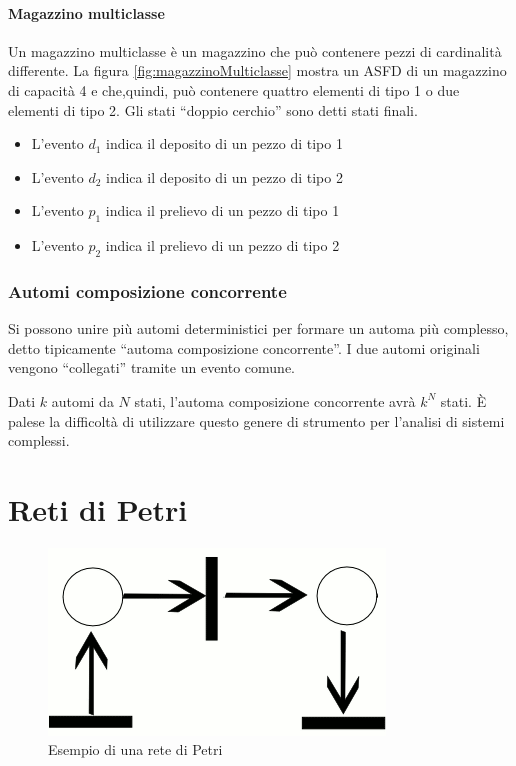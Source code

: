 \documentclass[a4paper]{report}
\begin{document}
\subsubsection{Magazzino multiclasse}
Un magazzino multiclasse \`e un magazzino che pu\`o contenere pezzi di
cardinalit\`a differente. La figura \ref{fig:magazzinoMulticlasse} mostra
un ASFD di un magazzino di capacit\`a 4 e che,quindi, pu\`o contenere
quattro elementi di tipo 1 o due elementi di tipo 2. Gli stati
``doppio cerchio'' sono detti stati finali.

\begin{itemize}
\item L'evento $d_1$ indica il deposito di un pezzo di tipo 1
\item L'evento $d_2$ indica il deposito di un pezzo di tipo 2
\item L'evento $p_1$ indica il prelievo di un pezzo di tipo 1
\item L'evento $p_2$ indica il prelievo di un pezzo di tipo 2
\end{itemize}


\subsection{Automi composizione concorrente}
Si possono unire pi\`u automi deterministici per formare un automa
pi\`u complesso, detto tipicamente ``automa composizione
concorrente''. I due automi originali vengono ``collegati'' tramite un
evento comune. 

Dati $k$ automi da $N$ stati, l'automa composizione concorrente avr\`a
$k^N$ stati. \`E palese la difficolt\`a di utilizzare questo genere di
strumento per l'analisi di sistemi complessi.

\chapter{Reti di Petri}
\begin{figure}[!h]
  \begin{center}
    \includegraphics[scale=0.5]{./figures/petri.png}
    \caption{Esempio di una rete di Petri}\label{fig:petri01}
  \end{center}
\end{figure} 
\end{document}
